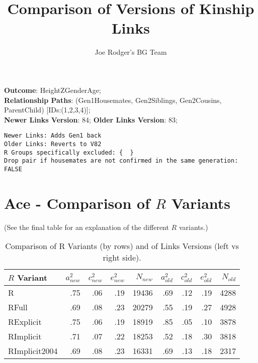\documentclass{article}\usepackage[]{graphicx}\usepackage[]{color}
\title{Comparison of Versions of Kinship Links}
\author{Joe Rodger's BG Team}
\makeatletter
\newenvironment{kframe}{%
 \def\at@end@of@kframe{}%
 \ifinner\ifhmode%
  \def\at@end@of@kframe{\end{minipage}}%
  \begin{minipage}{\columnwidth}%
 \fi\fi%
 \def\FrameCommand##1{\hskip\@totalleftmargin \hskip-\fboxsep
 \colorbox{shadecolor}{##1}\hskip-\fboxsep
     \hskip-\linewidth \hskip-\@totalleftmargin \hskip\columnwidth}%
 \MakeFramed {\advance\hsize-\width
   \@totalleftmargin\z@ \linewidth\hsize
   \@setminipage}}%
 {\par\unskip\endMakeFramed%
 \at@end@of@kframe}
\newenvironment{knitrout}{}{} %
\makeatother
\begin{document}
\maketitle
\setcounter{totalnumber}{8} %

\setlength{\parindent}{0pt}%











\textbf{Outcome}: HeightZGenderAge;\\
\textbf{Relationship Paths}: (Gen1Housemates, Gen2Siblings, Gen2Cousins, ParentChild) [IDs:(1,2,3,4)];\\
\textbf{Newer Links Version}: 84;
\textbf{Older Links Version}: 83;

\begin{knitrout}
\color{fgcolor}\begin{kframe}
\begin{verbatim}
Newer Links: Adds Gen1 back
Older Links: Reverts to V82
R Groups specifically excluded: {  }
Drop pair if housemates are not confirmed in the same generation: FALSE
\end{verbatim}
\end{kframe}
\end{knitrout}





\section{Ace - Comparison of $R$ Variants} 
(See the final table for an explanation of the different $R$ variants.)
\begin{table}[ht]
\centering
{\large
\begin{tabular}{l|rrrr|rrrr}
  \hline
$R$ Variant & $a_{new}^2$ & $c_{new}^2$ & $e_{new}^2$ & $N_{new}$ & $a_{old}^2$ & $c_{old}^2$ & $e_{old}^2$ & $N_{old}$ \\ 
  \hline
R & .75 & .06 & .19 & 19436 & .69 & .12 & .19 & 4288 \\ 
  RFull & .69 & .08 & .23 & 20279 & .55 & .19 & .27 & 4928 \\ 
  RExplicit & .75 & .06 & .19 & 18919 & .85 & .05 & .10 & 3878 \\ 
  RImplicit & .71 & .07 & .22 & 18253 & .52 & .18 & .30 & 3818 \\ 
  RImplicit2004 & .69 & .08 & .23 & 16331 & .69 & .13 & .18 & 2317 \\ 
   \hline
\end{tabular}
}
\caption{Comparison of R Variants (by rows) and of Links Versions (left vs right side).} 
\end{table}
\end{document}
